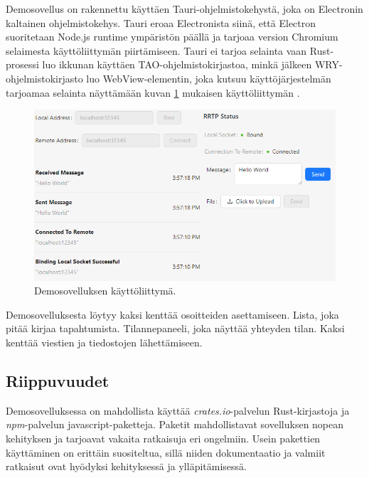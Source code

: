 \documentclass[a4paper,12pt]{article}
\begin{document}
    Demosovellus on rakennettu käyttäen Tauri-ohjelmistokehystä, joka on Electronin kaltainen ohjelmistokehys. Tauri eroaa Electronista siinä, että Electron suoritetaan Node.js runtime ympäristön päällä ja tarjoaa version Chromium selaimesta käyttöliittymän piirtämiseen. Tauri ei tarjoa selainta vaan Rust-prosessi luo ikkunan käyttäen TAO-ohjelmistokirjastoa, minkä jälkeen WRY-ohjelmistokirjasto luo WebView-elementin, joka kutsuu käyttöjärjestelmän tarjoamaa selainta näyttämään kuvan \ref{fig:demo_interface} mukaisen käyttöliittymän \cite{tauri-app}.

    \begin{figure}[h!]
        \centering
        
        \includegraphics[width=\textwidth]{doc/latex/src/images/RRTP.png}
        \caption{Demosovelluksen käyttöliittymä.}
        \label{fig:demo_interface}
    \end{figure}
    
    Demosovelluksesta löytyy kaksi kenttää osoitteiden asettamiseen. Lista, joka
    pitää kirjaa tapahtumista. Tilannepaneeli, joka näyttää yhteyden tilan.
    Kaksi kenttää viestien ja tiedostojen lähettämiseen. \par

    \subsection{Riippuvuudet}
    Demosovelluksessa on mahdollista käyttää \textit{crates.io}-palvelun Rust-kirjastoja ja \textit{npm}-palvelun javascript-paketteja. Paketit mahdollistavat sovelluksen nopean kehityksen ja tarjoavat vakaita ratkaisuja eri ongelmiin. Usein pakettien käyttäminen on erittäin suositeltua, sillä niiden dokumentaatio ja valmiit ratkaisut ovat hyödyksi kehityksessä ja ylläpitämisessä.
\end{document}

